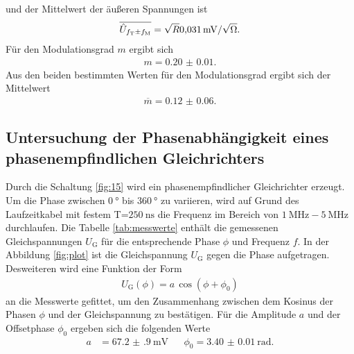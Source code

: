 und der Mittelwert der äußeren Spannungen ist
\begin{align}
  \overline{\hat{U}_{f_{\text{T}}\pm f_{\text{M}}}} = \sqrt{R}\SI{0.031(0)}{\milli\volt\per\sqrt{\ohm}}.
\end{align}
Für
den Modulationsgrad $m$ ergibt sich
\begin{align}
m=\num{0.20(1)}.
\end{align}
Aus den beiden bestimmten Werten für den Modulationsgrad
ergibt sich der Mittelwert
\begin{align}
\overline{m}=\num{0.12(6)}.
\end{align}




\FloatBarrier
\subsection{Untersuchung der Phasenabhängigkeit eines
phasenempfindlichen Gleichrichters}
\label{subsec:auswertung_e}
Durch die Schaltung \ref{fig:15} wird ein phasenempfindlicher
Gleichrichter erzeugt. Um die Phase \phi zwischen
$\SI{0}{\degree}$ bis $\SI{360}{\degree}$ zu variieren, wird
auf Grund des Laufzeitkabel mit festem T=$\SI{250}{\nano\second}$
die Frequenz im Bereich von $\SI{1}{\mega\hertz}-\SI{5}{\mega\hertz}$
durchlaufen. Die Tabelle \ref{tab:messwerte} enthält die gemessenen
Gleichspannungen $U_{\text{G}}$ für die entsprechende Phase $\phi$ und Frequenz $f$.
In der Abbildung \ref{fig:plot} ist die Gleichspannung $U_{\text{G}}$
gegen die Phase aufgetragen.
Desweiteren wird eine Funktion der Form
\begin{align}
  U_{\text{G}}(\phi)=a \, \cos(\phi+\phi_0)
\end{align}
an die Messwerte gefittet,
um den Zusammenhang zwischen dem Kosinus der
Phasen $\phi$ und der Gleichspannung zu bestätigen.
Für die Amplitude $a$ und der Offsetphase $\phi_0$
ergeben sich die folgenden Werte
\begin{align}
a&=\SI{67.2(9)}{\milli\volt}& &\phi_0=\SI{3.40(1)}{\radian}.
\end{align}

